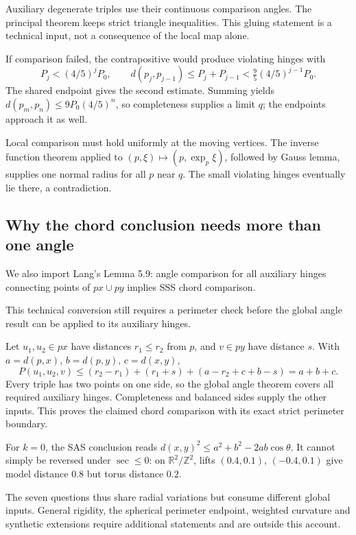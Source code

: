 \documentclass[12pt,reqno]{amsart}
\begin{document}
Auxiliary degenerate triples use their continuous comparison angles. The principal theorem keeps strict triangle inequalities. This gluing statement is a technical input, not a consequence of the local map alone.

If comparison failed, the contrapositive would produce violating hinges with
\[
P_j<(4/5)^jP_0,\qquad
d(p_j,p_{j-1})\le P_j+P_{j-1}
<\tfrac95(4/5)^{j-1}P_0.
\]
The shared endpoint gives the second estimate. Summing yields \(d(p_m,p_n)\le9P_0(4/5)^n\), so completeness supplies a limit \(q\); the endpoints approach it as well.

Local comparison must hold uniformly at the moving vertices. The inverse function theorem applied to \((p,\xi)\mapsto(p,\exp_p\xi)\), followed by Gauss lemma, supplies one normal radius for all \(p\) near \(q\). The small violating hinges eventually lie there, a contradiction.

\subsection*{Why the chord conclusion needs more than one angle}
We also import Lang's Lemma 5.9: angle comparison for all auxiliary hinges connecting points of \(px\cup py\) implies SSS chord comparison.

This technical conversion still requires a perimeter check before the global angle result can be applied to its auxiliary hinges.

Let \(u_1,u_2\in px\) have distances \(r_1\le r_2\) from \(p\), and \(v\in py\) have distance \(s\). With \(a=d(p,x)\), \(b=d(p,y)\), \(c=d(x,y)\),
\[
P(u_1,u_2,v)\le(r_2-r_1)+(r_1+s)+(a-r_2+c+b-s)=a+b+c.
\]
Every triple has two points on one side, so the global angle theorem covers all required auxiliary hinges. Completeness and balanced sides supply the other inputs. This proves the claimed chord comparison with its exact strict perimeter boundary.

For \(k=0\), the SAS conclusion reads \(d(x,y)^2\le a^2+b^2-2ab\cos\theta\). It cannot simply be reversed under \(\sec\le0\): on \(\mathbb R^2/\mathbb Z^2\), lifts \((0.4,0.1)\), \((-0.4,0.1)\) give model distance \(0.8\) but torus distance \(0.2\).

The seven questions thus share radial variations but consume different global inputs. General rigidity, the spherical perimeter endpoint, weighted curvature and synthetic extensions require additional statements and are outside this account.



\end{document}
